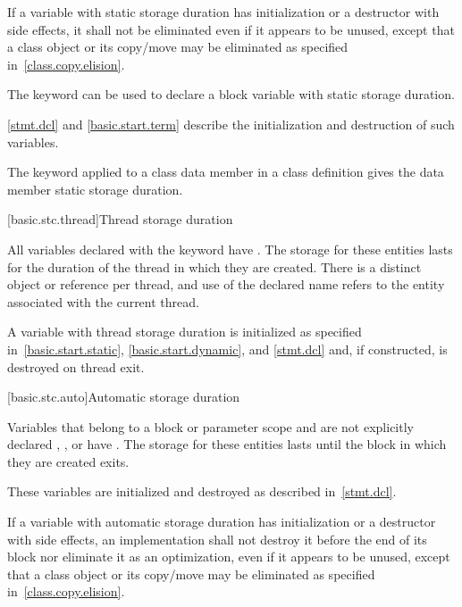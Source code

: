 \pnum
If a variable with static storage duration has initialization or a
destructor with side effects, it shall not be eliminated even if it
appears to be unused, except that a class object or its copy/move may be
eliminated as specified in~\ref{class.copy.elision}.

\pnum
{}%
The keyword  can be used to declare
a block variable with static storage duration.
\begin{note}
\ref{stmt.dcl} and \ref{basic.start.term} describe the
initialization and destruction of such variables.
\end{note}

\pnum
{}%
The keyword  applied to a class data member in a class
definition gives the data member static storage duration.

[basic.stc.thread]{Thread storage duration}

\pnum
All variables declared with the  keyword have
.
The storage for these entities lasts for the duration of
the thread in which they are created. There is a distinct object or reference
per thread, and use of the declared name refers to the entity associated with
the current thread.

\pnum
\begin{note}
A variable with thread storage duration is initialized as specified
in~\ref{basic.start.static}, \ref{basic.start.dynamic}, and \ref{stmt.dcl}
and, if constructed, is destroyed on thread exit.
\end{note}

[basic.stc.auto]{Automatic storage duration}

\pnum
{}%
Variables that belong to a block or parameter scope and are
not explicitly declared , , or  have
. The storage
for these entities lasts until the block in which they are created exits.

\pnum
\begin{note}
These variables are initialized and destroyed as described in~\ref{stmt.dcl}.
\end{note}

\pnum
If a variable with automatic storage duration has initialization or a destructor with side
effects, an implementation shall not destroy it before the end of its block
nor eliminate it as an optimization, even if it appears to be
unused, except that a class object or its copy/move may be eliminated as
specified in~\ref{class.copy.elision}.

